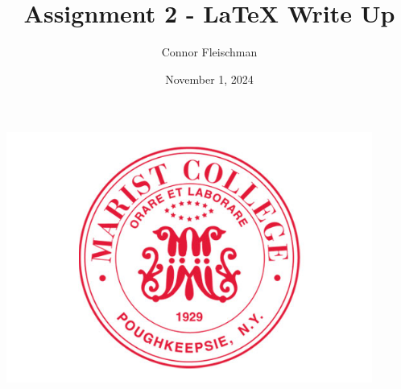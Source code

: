 \documentclass[12pt, letterpaper]{article}
\title{Assignment 2 - LaTeX Write Up}
\author{Connor Fleischman}
\date{November 1, 2024}
\begin{document}
\maketitle
\begin{center}
   \includegraphics[width=120mm,scale=0.5]{MaristSeal.png}
\end{center}
\newpage

\end{document}
